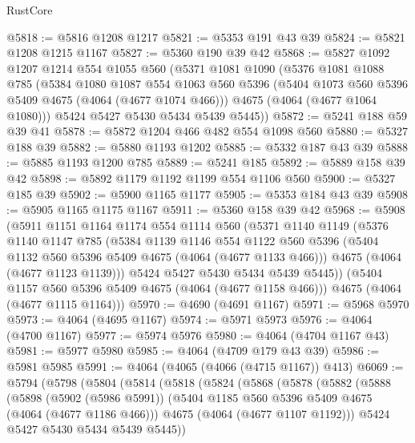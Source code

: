 \begin{lexlean}{RustCore}
\begin{coremodule}
@5818 := @5816 @1208 @1217
@5821 := @5353 @191 @43 @39
@5824 := @5821 @1208 @1215 @1167
@5827 := @5360 @190 @39 @42
@5868 := @5827
    @1092
    @1207
    @1214
    @554
    @1055
    @560
    (@5371
      @1081
      @1090
      (@5376
        @1081
        @1088
        @785
        (@5384
          @1080
          @1087
          @554
          @1063
          @560
          @5396
          (@5404 @1073 @560 @5396 @5409 @4675 (@4064 (@4677 @1074 @466)))
          @4675
          (@4064 (@4677 @1064 @1080)))
        @5424
        @5427
        @5430
        @5434
        @5439
        @5445))
@5872 := @5241 @188 @59 @39 @41
@5878 := @5872 @1204 @466 @482 @554 @1098 @560
@5880 := @5327 @188 @39
@5882 := @5880 @1193 @1202
@5885 := @5332 @187 @43 @39
@5888 := @5885 @1193 @1200 @785
@5889 := @5241 @185
@5892 := @5889 @158 @39 @42
@5898 := @5892 @1179 @1192 @1199 @554 @1106 @560
@5900 := @5327 @185 @39
@5902 := @5900 @1165 @1177
@5905 := @5353 @184 @43 @39
@5908 := @5905 @1165 @1175 @1167
@5911 := @5360 @158 @39 @42
@5968 := @5908
    (@5911
      @1151
      @1164
      @1174
      @554
      @1114
      @560
      (@5371
        @1140
        @1149
        (@5376
          @1140
          @1147
          @785
          (@5384
            @1139
            @1146
            @554
            @1122
            @560
            @5396
            (@5404 @1132 @560 @5396 @5409 @4675 (@4064 (@4677 @1133 @466)))
            @4675
            (@4064 (@4677 @1123 @1139)))
          @5424
          @5427
          @5430
          @5434
          @5439
          @5445))
      (@5404 @1157 @560 @5396 @5409 @4675 (@4064 (@4677 @1158 @466)))
      @4675
      (@4064 (@4677 @1115 @1164)))
@5970 := @4690 (@4691 @1167)
@5971 := @5968 @5970
@5973 := @4064 (@4695 @1167)
@5974 := @5971 @5973
@5976 := @4064 (@4700 @1167)
@5977 := @5974 @5976
@5980 := @4064 (@4704 @1167 @43)
@5981 := @5977 @5980
@5985 := @4064 (@4709 @179 @43 @39)
@5986 := @5981 @5985
@5991 := @4064 (@4065 (@4066 (@4715 @1167)) @413)
@6069 := @5794
    (@5798
      (@5804
        (@5814
          (@5818
            (@5824
              (@5868
                (@5878
                  (@5882
                    (@5888
                      (@5898
                        (@5902 (@5986 @5991))
                        (@5404 @1185 @560 @5396 @5409 @4675 (@4064 (@4677 @1186 @466)))
                        @4675
                        (@4064 (@4677 @1107 @1192)))
                      @5424
                      @5427
                      @5430
                      @5434
                      @5439
                      @5445))

\end{coremodule}
\end{lexlean}
